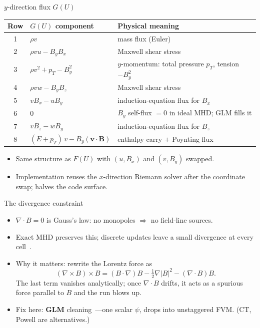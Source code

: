 \documentclass[aspectratio=43]{beamer}
\begin{document}
\begin{frame}{$y$-direction flux $G(U)$}
  \centering
  \footnotesize
  \begin{tabular}{c@{\quad}l@{\qquad}l}
  \toprule
  Row & $G(U)$ component & Physical meaning \\
  \midrule
  1 & $\rho v$                                       & mass flux (Euler) \\
  2 & $\rho v u - B_y B_x$                           & Maxwell shear stress \\
  3 & $\rho v^{2} + p_T - B_y^{2}$                   & $y$-momentum: total pressure $p_T$, tension $-B_y^{2}$ \\
  4 & $\rho v w - B_y B_z$                           & Maxwell shear stress \\
  5 & $v B_x - u B_y$                                & induction-equation flux for $B_x$ \\
  6 & $0$                                            & $B_y$ self-flux $= 0$ in ideal MHD; GLM fills it \\
  7 & $v B_z - w B_y$                                & induction-equation flux for $B_z$ \\
  8 & $(E + p_T)\,v - B_y(\mathbf{v}\!\cdot\!\mathbf{B})$ & enthalpy carry $+$ Poynting flux \\
  \bottomrule
  \end{tabular}
  \vspace{0.6em}
  \begin{itemize}\scriptsize
    \item Same structure as $F(U)$ with $(u, B_x)$ and $(v, B_y)$ swapped.
    \item Implementation reuses the $x$-direction Riemann solver after the coordinate swap; halves the code surface.
  \end{itemize}
\end{frame}

\begin{frame}{The divergence constraint}
  \begin{itemize}
    \item $\nabla\cdot B = 0$ is Gauss's law: no monopoles $\Rightarrow$ no field-line sources.
    \item Exact MHD preserves this; discrete updates leave a small divergence at every cell~\cite{balsara1999,powell1999}.
    \item Why it matters: rewrite the Lorentz force as
      \[
      (\nabla\times B)\times B = (B\cdot\nabla)B - \tfrac{1}{2}\nabla|B|^{2} - (\nabla\cdot B)B.
      \]
      The last term vanishes analytically; once $\nabla\cdot B$ drifts, it acts as a spurious force parallel to $B$ and the run blows up.
    \item Fix here: \textbf{GLM} cleaning~\cite{dedner2002}---one scalar $\psi$, drops into unstaggered FVM. (CT, Powell are alternatives.)
  \end{itemize}
\end{frame}
\end{document}
